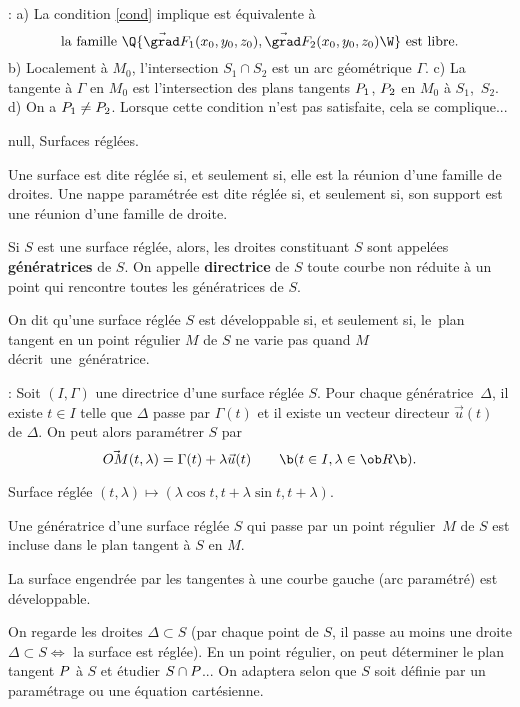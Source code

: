 \Remarques : a) La condition \eqref{cond} implique est équivalente à 
$$ 
\mbox{la famille }\Q\{\vec{\grad }F_1(x_0,y_0,z_0), \vec{\grad }F_2(x_0,y_0,z_0)\W\} \mbox{ est libre.}
$$ 
b) Localement à $M_0$, l'intersection $S_1\cap S_2$ est un arc géométrique $\Gamma$. \pn
c) La tangente à $\Gamma$ en $M_0$ est l'intersection 
des plans tangents $\sc P_1$, $\sc P_2$ en $M_0$ à $S_1$,~$S_2$. \pn
d) On a $\sc P_1\neq \sc P_2$. Lorsque cette condition n'est pas satisfaite, 
cela se complique...
\bigskip

\Subsection null, Surfaces réglées.

\Definition [] Une surface est dite réglée si, et seulement si, elle est la réunion 
d'une famille de droites. \pn
Une nappe paramétrée est dite réglée si, et seulement si, 
son support est une réunion d'une famille de droite. 
\bigskip

\Definition [] Si $S$ est une surface réglée, alors, les droites constituant $S$ 
sont appelées {\bf génératrices} de $S$. \pn
On appelle {\bf directrice} de $S$ toute courbe 
non réduite à un point qui rencontre toutes les génératrices de $S$. 
\bigskip

\Definition [] On dit qu'une surface réglée $S$ est développable si, et seulement si, 
le~plan tangent en un point régulier $M$ de $S$ ne varie pas quand $M$ 
décrit~une~génératrice. 
\bigskip

\Remarque : Soit $(I,\Gamma)$ une directrice d'une surface réglée $S$. 
Pour chaque génératrice~$\Delta$, il existe $t\in I$ telle que $\Delta$ 
passe par $\Gamma(t)$ et il existe un vecteur directeur $\vec u(t)$ de $\Delta$. 
On peut alors paramétrer $S$ par 
$$
\vec{OM}(t,\lambda)=\Gamma(t)+\lambda\vec u(t)\qquad\b(t\in I,\lambda\in\ob R\b).
$$ 
\centerline{%
}%
\Figure [Index=Surfaces!Intersection]  Surface réglée $(t,\lambda)\mapsto( \lambda\cos t,t+\lambda\sin t,
t+\lambda)$.

\Propriete [] Une génératrice d'une surface réglée $S$ qui passe 
par un point régulier~$M$ de $S$ est incluse 
dans le plan tangent à $S$ en $M$. 
\bigskip

\Theoreme [] La surface engendrée par les tangentes à une courbe gauche (arc paramétré) 
est développable. 
\bigskip

On regarde les droites $\Delta\subset S$ \pn(par chaque point de $S$, 
il passe au moins une droite 
$\Delta\subset S\Leftrightarrow$ la surface est réglée). \medskip\noindent 
En un point régulier, on peut déterminer le plan tangent $\sc P$ à $S$ 
et étudier $S\cap \sc P$... \medskip\pn
On adaptera selon que $S$ soit définie par un paramétrage ou une équation cartésienne. 
\bigskip

